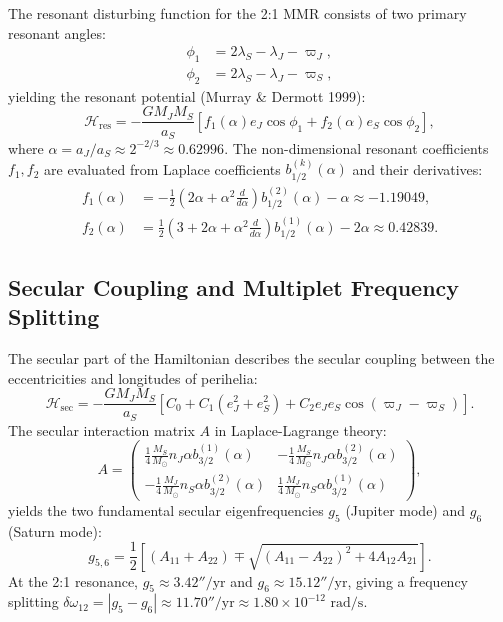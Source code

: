 \documentclass[11pt,a4paper]{article}
\begin{document}
The resonant disturbing function for the 2:1 MMR consists of two primary resonant angles:
\begin{align}
\phi_1 &= 2\lambda_S - \lambda_J - \varpi_J, \\
\phi_2 &= 2\lambda_S - \lambda_J - \varpi_S,
\end{align}
yielding the resonant potential (Murray \& Dermott 1999):
\begin{equation}
\mathcal{H}_{\text{res}} = -\frac{G M_J M_S}{a_S} \left[ f_1(\alpha) e_J \cos \phi_1 + f_2(\alpha) e_S \cos \phi_2 \right],
\end{equation}
where $\alpha = a_J / a_S \approx 2^{-2/3} \approx 0.62996$. The non-dimensional resonant coefficients $f_1, f_2$ are evaluated from Laplace coefficients $b_{1/2}^{(k)}(\alpha)$ and their derivatives:
\begin{align}
f_1(\alpha) &= -\frac{1}{2} \left( 2\alpha + \alpha^2 \frac{d}{d\alpha} \right) b_{1/2}^{(2)}(\alpha) - \alpha \approx -1.19049, \\
f_2(\alpha) &= \frac{1}{2} \left( 3 + 2\alpha + \alpha^2 \frac{d}{d\alpha} \right) b_{1/2}^{(1)}(\alpha) - 2\alpha \approx 0.42839.
\end{align}

\subsection{Secular Coupling and Multiplet Frequency Splitting}
The secular part of the Hamiltonian describes the secular coupling between the eccentricities and longitudes of perihelia:
\begin{equation}
\mathcal{H}_{\text{sec}} = -\frac{G M_J M_S}{a_S} \left[ C_0 + C_1 (e_J^2 + e_S^2) + C_2 e_J e_S \cos(\varpi_J - \varpi_S) \right].
\end{equation}
The secular interaction matrix $A$ in Laplace-Lagrange theory:
\begin{equation}
A = \begin{pmatrix}
\frac{1}{4} \frac{M_S}{M_\odot} n_J \alpha b_{3/2}^{(1)}(\alpha) & -\frac{1}{4} \frac{M_S}{M_\odot} n_J \alpha b_{3/2}^{(2)}(\alpha) \\
-\frac{1}{4} \frac{M_J}{M_\odot} n_S \alpha b_{3/2}^{(2)}(\alpha) & \frac{1}{4} \frac{M_J}{M_\odot} n_S \alpha b_{3/2}^{(1)}(\alpha)
\end{pmatrix},
\end{equation}
yields the two fundamental secular eigenfrequencies $g_5$ (Jupiter mode) and $g_6$ (Saturn mode):
\begin{equation}
g_{5,6} = \frac{1}{2} \left[ (A_{11} + A_{22}) \mp \sqrt{(A_{11} - A_{22})^2 + 4 A_{12} A_{21}} \right].
\end{equation}
At the 2:1 resonance, $g_5 \approx 3.42''/\text{yr}$ and $g_6 \approx 15.12''/\text{yr}$, giving a frequency splitting $\delta \omega_{12} = |g_5 - g_6| \approx 11.70''/\text{yr} \approx 1.80 \times 10^{-12}\text{ rad/s}$.
\end{document}
